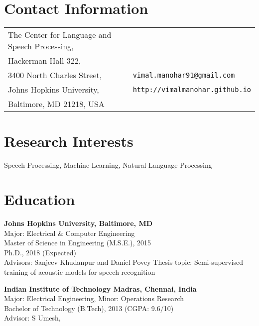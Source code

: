 \documentclass[margin,line,pifont,palatino,courier]{res}
\begin{document}

\begin{resume}

\section{\sc Contact Information}

\vspace{.05in}
\begin{tabular}{l l}
The Center for Language and Speech Processing, \\
Hackerman Hall 322,\\
3400 North Charles Street,                        & \verb+vimal.manohar91@gmail.com+\\
Johns Hopkins University,                  & \verb+http://vimalmanohar.github.io+\\
Baltimore, MD 21218, USA               & \\
\end{tabular}

\section{\sc Research Interests}
Speech Processing, Machine Learning, Natural Language Processing

\section{\sc Education}

\textbf{Johns Hopkins University, Baltimore, MD} \\
Major: Electrical \& Computer Engineering \\
Master of Science in Engineering (M.S.E.), 2015\\
Ph.D., 2018 (Expected) \\
Advisors: Sanjeev Khudanpur and Daniel Povey
Thesis topic: Semi-supervised training of acoustic models for speech recognition

\textbf{Indian Institute of Technology Madras, Chennai, India} \\
Major: Electrical Engineering, \quad Minor: Operations Research \\
Bachelor of Technology (B.Tech), 2013 (CGPA: 9.6/10) \\
Advisor: S Umesh, \\

\vspace{-2pt}


\end{resume}
\end{document}
